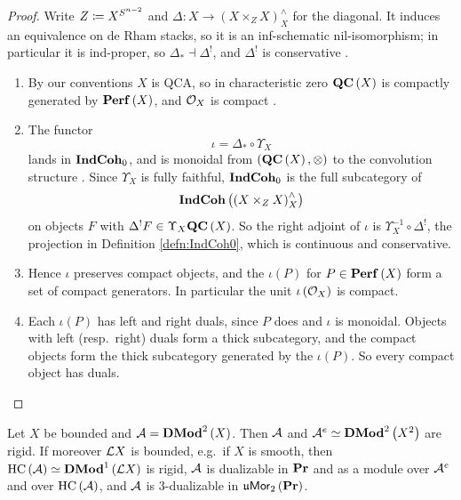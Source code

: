 \begin{proof}
Write $Z\coloneqq X^{S^{n-2}}$ and $\Delta\colon X\to\left(X\times_Z X\right)^\wedge_X$ for the diagonal. It induces an
equivalence on de Rham stacks, so it is an inf-schematic nil-isomorphism; in particular it is
ind-proper, so $\Delta_*\dashv\Delta^!$, and $\Delta^!$ is conservative \cite[Part~I]{GR:v2}.
\begin{enumerate}
\item By our conventions $X$ is QCA, so in characteristic zero $\mathbf{QC}\left(X\right)$ is
compactly generated by $\mathbf{Perf}\left(X\right)$, and $\mathcal{O}_X$ is compact \cite{DG:finiteness}.
\item The functor
\begin{equation*}
\iota = \Delta_*\circ\Upsilon_X
\end{equation*}
lands in $\mathbf{IndCoh}_0$, and is monoidal from $\left(\mathbf{QC}\left(X\right),\otimes\right)$ to the
convolution structure \cite{Ber:center}.
Since $\Upsilon_X$ is fully faithful, $\mathbf{IndCoh}_0$ is the full subcategory of
\begin{equation*}
\mathbf{IndCoh}\left(\left(X\times_ZX\right)^\wedge_X\right)
\end{equation*}
on objects $F$ with
$\Delta^!F\in\Upsilon_X\mathbf{QC}\left(X\right)$. So the right adjoint of $\iota$ is
$\Upsilon_X^{-1}\circ\Delta^!$, the projection in Definition \ref{defn:IndCoh0}, which is
continuous and conservative.
\item Hence $\iota$ preserves compact objects, and the $\iota\left(P\right)$ for
$P\in\mathbf{Perf}\left(X\right)$ form a set of compact generators. In particular the unit
$\iota\left(\mathcal{O}_X\right)$ is compact.
\item Each $\iota\left(P\right)$ has left and right duals, since $P$ does and $\iota$ is
monoidal. Objects with left (resp.\ right) duals form a thick subcategory, and the compact
objects form the thick subcategory generated by the $\iota\left(P\right)$. So every compact
object has duals. \qedhere
\end{enumerate}
\end{proof}

\begin{cor}
\label{cor:3dual}
Let $X$ be bounded and $\mathcal{A} = \mathbf{DMod}^2\left(X\right)$. Then $\mathcal{A}$ and
$\mathcal{A}^e\simeq\mathbf{DMod}^2\left(X^2\right)$ are rigid.
If moreover $\mathcal{L} X$ is bounded, e.g.\ if $X$ is smooth, then
$\operatorname{HC}\left(\mathcal{A}\right)\simeq\mathbf{DMod}^1\left(\mathcal{L} X\right)$ is rigid,
$\mathcal{A}$ is dualizable in $\mathbf{Pr}$ and as a module over $\mathcal{A}^e$ and over $\operatorname{HC}\left(\mathcal{A}\right)$, and $\mathcal{A}$
is $3$-dualizable in $\mathfrak{u}\mathsf{Mor}_2\left(\mathbf{Pr}\right)$.
\end{cor}

